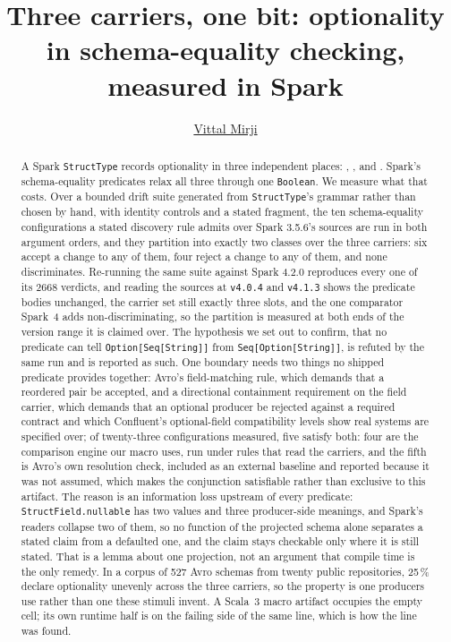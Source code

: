 \documentclass[sigplan,screen,nonacm]{acmart}
\title[Three carriers, one bit]{Three carriers, one bit: optionality in schema-equality checking, measured in Spark}
\author{\href{https://vitthalmirji.com/}{Vittal Mirji}}
\affiliation{
  \position{Staff Software Engineer}
  \country{ }
}
\begin{document}
\begin{abstract}
A Spark \texttt{StructType} records optionality in three independent places: , , and . Spark's schema-equality predicates relax all three through one \texttt{Boolean}. We measure what that costs. Over a bounded drift suite generated from \texttt{StructType}'s grammar rather than chosen by hand, with identity controls and a stated fragment, the ten schema-equality configurations a stated discovery rule admits over Spark 3.5.6's sources are run in both argument orders, and they partition into exactly two classes over the three carriers: six accept a change to any of them, four reject a change to any of them, and none discriminates. Re-running the same suite against Spark 4.2.0 reproduces every one of its 2668 verdicts, and reading the sources at \texttt{v4.0.4} and \texttt{v4.1.3} shows the predicate bodies unchanged, the carrier set still exactly three slots, and the one comparator Spark~4 adds non-discriminating, so the partition is measured at both ends of the version range it is claimed over. The hypothesis we set out to confirm, that no predicate can tell \texttt{Option[Seq[String]]} from \texttt{Seq[Option[String]]}, is refuted by the same run and is reported as such. One boundary needs two things no shipped predicate provides together: Avro's field-matching rule, which demands that a reordered pair be accepted, and a directional containment requirement on the field carrier, which demands that an optional producer be rejected against a required contract and which Confluent's optional-field compatibility levels show real systems are specified over; of twenty-three configurations measured, five satisfy both: four are the comparison engine our macro uses, run under rules that read the carriers, and the fifth is Avro's own resolution check, included as an external baseline and reported because it was not assumed, which makes the conjunction satisfiable rather than exclusive to this artifact. The reason is an information loss upstream of every predicate: \texttt{StructField.nullable} has two values and three producer-side meanings, and Spark's readers collapse two of them, so no function of the projected schema alone separates a stated claim from a defaulted one, and the claim stays checkable only where it is still stated. That is a lemma about one projection, not an argument that compile time is the only remedy. In a corpus of 527 Avro schemas from twenty public repositories, 25\,\% declare optionality unevenly across the three carriers, so the property is one producers use rather than one these stimuli invent. A Scala~3 macro artifact occupies the empty cell; its own runtime half is on the failing side of the same line, which is how the line was found.
\end{abstract}
\end{document}
